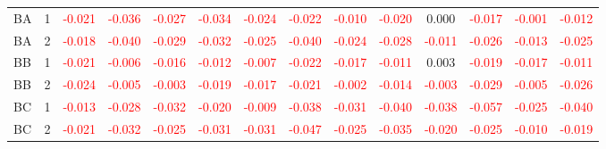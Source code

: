 \begin{table}[H]
{\begin{tabular}{llcccccccccccc}
BA & 1 & \textcolor{red}{-0.021} & \textcolor{red}{-0.036} & \textcolor{red}{-0.027} & \textcolor{red}{-0.034} & \textcolor{red}{-0.024} & \textcolor{red}{-0.022} & \textcolor{red}{-0.010} & \textcolor{red}{-0.020} & 0.000 & \textcolor{red}{-0.017} & \textcolor{red}{-0.001} & \textcolor{red}{-0.012}\\
BA & 2 & \textcolor{red}{-0.018} & \textcolor{red}{-0.040} & \textcolor{red}{-0.029} & \textcolor{red}{-0.032} & \textcolor{red}{-0.025} & \textcolor{red}{-0.040} & \textcolor{red}{-0.024} & \textcolor{red}{-0.028} & \textcolor{red}{-0.011} & \textcolor{red}{-0.026} & \textcolor{red}{-0.013} & \textcolor{red}{-0.025}\\
BB & 1 & \textcolor{red}{-0.021} & \textcolor{red}{-0.006} & \textcolor{red}{-0.016} & \textcolor{red}{-0.012} & \textcolor{red}{-0.007} & \textcolor{red}{-0.022} & \textcolor{red}{-0.017} & \textcolor{red}{-0.011} & 0.003 & \textcolor{red}{-0.019} & \textcolor{red}{-0.017} & \textcolor{red}{-0.011}\\
BB & 2 & \textcolor{red}{-0.024} & \textcolor{red}{-0.005} & \textcolor{red}{-0.003} & \textcolor{red}{-0.019} & \textcolor{red}{-0.017} & \textcolor{red}{-0.021} & \textcolor{red}{-0.002} & \textcolor{red}{-0.014} & \textcolor{red}{-0.003} & \textcolor{red}{-0.029} & \textcolor{red}{-0.005} & \textcolor{red}{-0.026}\\
BC & 1 & \textcolor{red}{-0.013} & \textcolor{red}{-0.028} & \textcolor{red}{-0.032} & \textcolor{red}{-0.020} & \textcolor{red}{-0.009} & \textcolor{red}{-0.038} & \textcolor{red}{-0.031} & \textcolor{red}{-0.040} & \textcolor{red}{-0.038} & \textcolor{red}{-0.057} & \textcolor{red}{-0.025} & \textcolor{red}{-0.040}\\
BC & 2 & \textcolor{red}{-0.021} & \textcolor{red}{-0.032} & \textcolor{red}{-0.025} & \textcolor{red}{-0.031} & \textcolor{red}{-0.031} & \textcolor{red}{-0.047} & \textcolor{red}{-0.025} & \textcolor{red}{-0.035} & \textcolor{red}{-0.020} & \textcolor{red}{-0.025} & \textcolor{red}{-0.010} & \textcolor{red}{-0.019}\\
\hline
    \end{tabular}%
    }
    \label{tab:cen4_cov}
\end{table}

